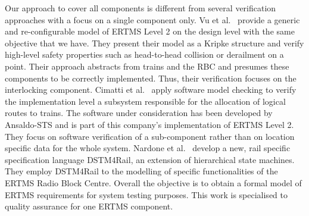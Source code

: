 Our approach to cover all components is different from several
verification approaches with a focus on a single component only.
%
Vu et al.~\cite{vu15} provide a generic and re-configurable model
of ERTMS Level 2 on the design level with the same objective that we
have. They present their model as a Kripke structure and verify
high-level safety properties such as head-to-head collision or
derailment on a point. %
Their approach
%
abstracts from trains and the RBC and presumes these components to be
correctly implemented. Thus, their verification focuses on the
interlocking component.
%
%
Cimatti et al.~\cite{cimatti12} apply software model checking to
verify the implementation level a subsystem responsible for the
allocation of logical routes to trains. The software under
consideration has been developed by Ansaldo-STS and is part of this
company's implementation of ERTMS Level 2. %
They focus on software verification of a sub-component rather than on
location specific data for the whole system.
%
Nardone et al.~\cite{nardone14} develop a new, rail specific
specification language DSTM4Rail, an extension of hierarchical state
machines. They employ DSTM4Rail to the modelling of specific
functionalities of the ERTMS Radio Block Centre. Overall the objective
is to obtain a formal model of ERTMS requirements for system testing
purposes. %
This work is specialised to quality assurance for one ERTMS component.

